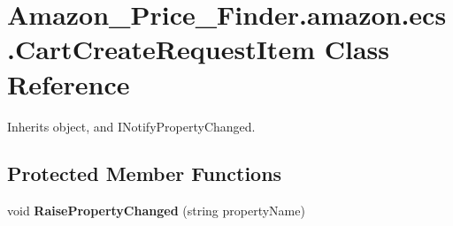 \hypertarget{class_amazon___price___finder_1_1amazon_1_1ecs_1_1_cart_create_request_item}{\section{Amazon\-\_\-\-Price\-\_\-\-Finder.\-amazon.\-ecs.\-Cart\-Create\-Request\-Item Class Reference}
\label{class_amazon___price___finder_1_1amazon_1_1ecs_1_1_cart_create_request_item}
}


 




Inherits object, and I\-Notify\-Property\-Changed.

\subsection*{Protected Member Functions}
\begin{DoxyCompactItemize}
\item 
\hypertarget{class_amazon___price___finder_1_1amazon_1_1ecs_1_1_cart_create_request_item_afd5593d85e975a26f808c1c6210c2a71}{void {\bfseries Raise\-Property\-Changed} (string property\-Name)}\label{class_amazon___price___finder_1_1amazon_1_1ecs_1_1_cart_create_request_item_afd5593d85e975a26f808c1c6210c2a71}

\end{DoxyCompactItemize}
